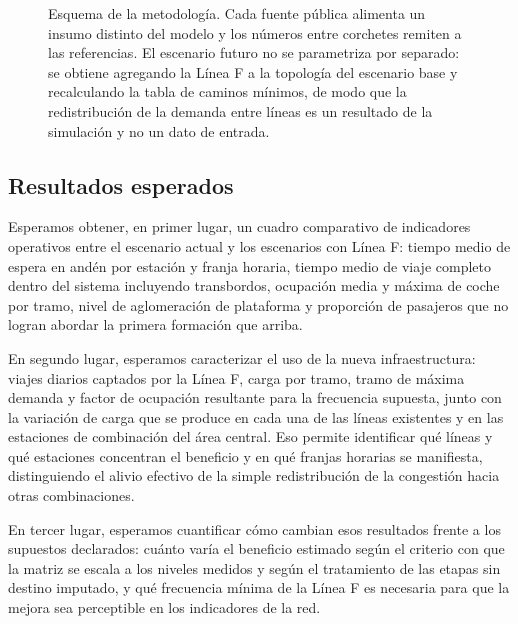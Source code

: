 \documentclass{article}
\begin{document}
\begin{figure}[htbp]
  \caption{Esquema de la metodología. Cada fuente pública alimenta un insumo distinto del modelo y los
  números entre corchetes remiten a las referencias. El escenario futuro no se parametriza por separado: se
  obtiene agregando la Línea F a la topología del escenario base y recalculando la tabla de caminos mínimos,
  de modo que la redistribución de la demanda entre líneas es un resultado de la simulación y no un dato de
  entrada.}
  \label{fig:metodo}
\end{figure}

\subsection{Resultados esperados}

Esperamos obtener, en primer lugar, un cuadro comparativo de indicadores operativos entre el escenario
actual y los escenarios con Línea F: tiempo medio de espera en andén por estación y franja horaria, tiempo
medio de viaje completo dentro del sistema incluyendo transbordos, ocupación media y máxima de coche por
tramo, nivel de aglomeración de plataforma y proporción de pasajeros que no logran abordar la primera
formación que arriba.

En segundo lugar, esperamos caracterizar el uso de la nueva infraestructura: viajes diarios captados por la
Línea F, carga por tramo, tramo de máxima demanda y factor de ocupación resultante para la frecuencia
supuesta, junto con la variación de carga que se produce en cada una de las líneas existentes y en las
estaciones de combinación del área central. Eso permite identificar qué líneas y qué estaciones concentran
el beneficio y en qué franjas horarias se manifiesta, distinguiendo el alivio efectivo de la simple
redistribución de la congestión hacia otras combinaciones.

En tercer lugar, esperamos cuantificar cómo cambian esos resultados frente a los supuestos declarados:
cuánto varía el beneficio estimado según el criterio con que la matriz se escala a los niveles medidos y
según el tratamiento de las etapas sin destino imputado, y qué frecuencia mínima de la Línea F es necesaria
para que la mejora sea perceptible en los indicadores de la red.
\end{document}

